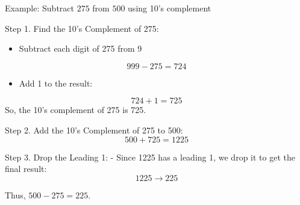 \vspace{\baselineskip}\par
Example: Subtract \( 275 \) from \( 500 \) using 10’s complement
\vspace{\baselineskip}\par
Step 1. Find the 10’s Complement of 275:
  \begin{itemize}
    \item Subtract each digit of 275 from 9
  \end{itemize}  
     \[
     999 - 275 = 724
     \]
  \begin{itemize}
    \item Add 1 to the result:
  \end{itemize}
     \[
     724 + 1 = 725
     \]
   So, the 10’s complement of 275 is 725.

\vspace{\baselineskip}\par
Step 2. Add the 10’s Complement of 275 to 500:
   \[
   500 + 725 = 1225
   \]

Step 3. Drop the Leading 1:
   - Since 1225 has a leading 1, we drop it to get the final result:
   \[
   1225 \rightarrow 225
   \]

Thus, \( 500 - 275 = 225 \).

